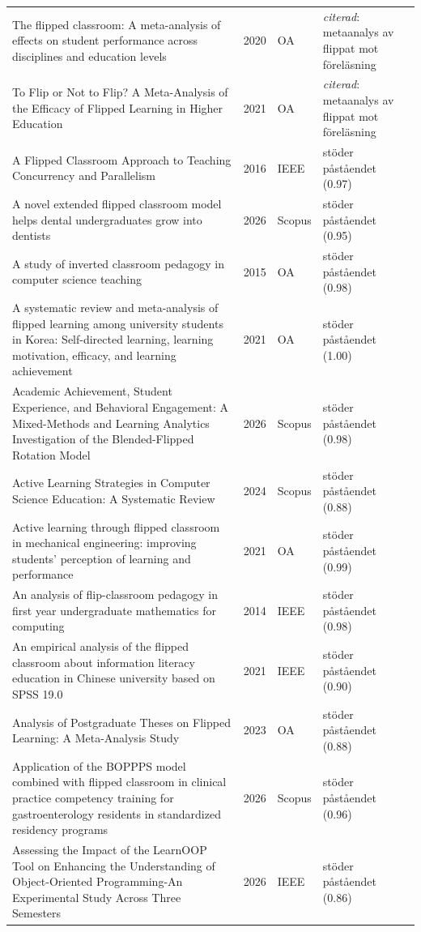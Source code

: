 \begin{longtable}{@{}%
  >{\raggedright\arraybackslash}p{}c%
  >{\raggedright\arraybackslash}p{}%
  >{\raggedright\arraybackslash}p{}@{}}
The flipped classroom: A meta-analysis of effects on student performance across disciplines and education levels & 2020 & OA & \emph{citerad}: metaanalys av flippat mot föreläsning \\
To Flip or Not to Flip? A Meta-Analysis of the Efficacy of Flipped Learning in Higher Education & 2021 & OA & \emph{citerad}: metaanalys av flippat mot föreläsning \\
A Flipped Classroom Approach to Teaching Concurrency and Parallelism & 2016 & IEEE & stöder påståendet (0.97) \\
A novel extended flipped classroom model helps dental undergraduates grow into dentists & 2026 & Scopus & stöder påståendet (0.95) \\
A study of inverted classroom pedagogy in computer science teaching & 2015 & OA & stöder påståendet (0.98) \\
A systematic review and meta-analysis of flipped learning among university students in Korea: Self-directed learning, learning motivation, efficacy, and learning achievement & 2021 & OA & stöder påståendet (1.00) \\
Academic Achievement, Student Experience, and Behavioral Engagement: A Mixed-Methods and Learning Analytics Investigation of the Blended-Flipped Rotation Model & 2026 & Scopus & stöder påståendet (0.98) \\
Active Learning Strategies in Computer Science Education: A Systematic Review & 2024 & Scopus & stöder påståendet (0.88) \\
Active learning through flipped classroom in mechanical engineering: improving students' perception of learning and performance & 2021 & OA & stöder påståendet (0.99) \\
An analysis of flip-classroom pedagogy in first year undergraduate mathematics for computing & 2014 & IEEE & stöder påståendet (0.98) \\
An empirical analysis of the flipped classroom about information literacy education in Chinese university based on SPSS 19.0 & 2021 & IEEE & stöder påståendet (0.90) \\
Analysis of Postgraduate Theses on Flipped Learning: A Meta-Analysis Study & 2023 & OA & stöder påståendet (0.88) \\
Application of the BOPPPS model combined with flipped classroom in clinical practice competency training for gastroenterology residents in standardized residency programs & 2026 & Scopus & stöder påståendet (0.96) \\
Assessing the Impact of the LearnOOP Tool on Enhancing the Understanding of Object-Oriented Programming-An Experimental Study Across Three Semesters & 2026 & IEEE & stöder påståendet (0.86) \\

\end{longtable}

